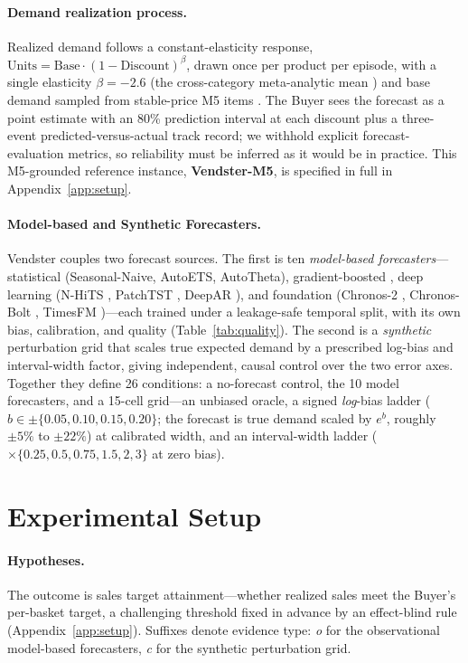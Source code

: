 \documentclass{article}
\begin{document}
\paragraph{Demand realization process.} Realized demand follows a constant-elasticity response, $\text{Units}=\text{Base}\cdot(1-\text{Discount})^{\beta}$, drawn once per product per episode, with a single elasticity $\beta=-2.6$ (the cross-category meta-analytic mean \citep{bijmolt2005new}) and base demand sampled from stable-price M5 items \citep{makridakis2022m5}. The Buyer sees the forecast as a point estimate with an 80\% prediction interval at each discount plus a three-event predicted-versus-actual track record; we withhold explicit forecast-evaluation metrics, so reliability must be inferred as it would be in practice. This M5-grounded reference instance, \textbf{Vendster-M5}, is specified in full in Appendix~\ref{app:setup}.

\paragraph{Model-based and Synthetic Forecasters.} Vendster couples two forecast sources. The first is ten \emph{model-based forecasters}---statistical \citep{petropoulos2020simple} (Seasonal-Naive, AutoETS, AutoTheta), gradient-boosted \citep{ke2017lightgbm}, deep learning (N-HiTS \citep{challu2023nhits}, PatchTST \citep{nie2022time}, DeepAR \citep{salinas2020deepar}), and foundation (Chronos-2 \citep{ansari2025chronos}, Chronos-Bolt \citep{ansari2024chronos}, TimesFM \citep{das2023decoder})---each trained under a leakage-safe temporal split, with its own bias, calibration, and quality (Table~\ref{tab:quality}). The second is a \emph{synthetic} perturbation grid that scales true expected demand by a prescribed log-bias and interval-width factor, giving independent, causal control over the two error axes. Together they define 26 conditions: a no-forecast control, the 10 model forecasters, and a 15-cell grid---an unbiased oracle, a signed \emph{log}-bias ladder ($b\in\pm\{0.05,0.10,0.15,0.20\}$; the forecast is true demand scaled by $e^{b}$, roughly $\pm5\%$ to $\pm22\%$) at calibrated width, and an interval-width ladder ($\times\{0.25,0.5,0.75,1.5,2,3\}$ at zero bias).

\section{Experimental Setup}

\paragraph{Hypotheses.} The outcome is sales target attainment---whether realized sales meet the Buyer's per-basket target, a challenging threshold fixed in advance by an effect-blind rule (Appendix~\ref{app:setup}). Suffixes denote evidence type: \emph{o} for the observational model-based forecasters, \emph{c} for the synthetic perturbation grid.
\end{document}
